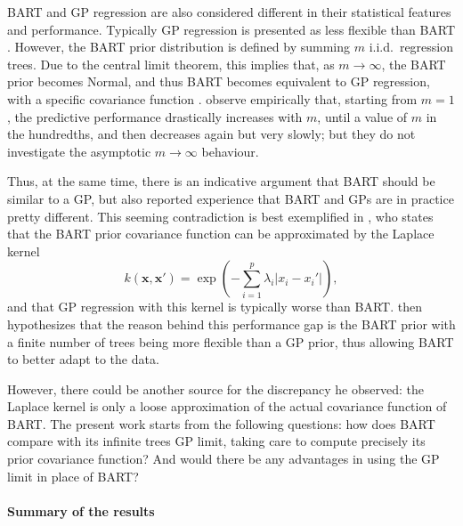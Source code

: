 \documentclass[a4paper]{article}
\theoremstyle{definition}
\begin{document}
    BART and GP regression are also considered different in their statistical features and performance. Typically GP regression is presented as less flexible than BART \autocite[see, e.g.,][]{jeong2023}. However, the BART prior distribution is defined by summing $m$ i.i.d.\ regression trees. Due to the central limit theorem, this implies that, as $m\to\infty$, the BART prior becomes Normal, and thus BART becomes equivalent to GP regression, with a specific covariance function \autocite[th.~1]{linero2017}. \textcite[\S2.2.5, p.~273]{chipman2010} observe empirically that, starting from $m=1$, the predictive performance drastically increases with $m$, until a value of $m$ in the hundredths, and then decreases again but very slowly; but they do not investigate the asymptotic $m\to\infty$ behaviour.

    Thus, at the same time, there is an indicative argument that BART should be similar to a GP, but also reported experience that BART and GPs are in practice pretty different. This seeming contradiction is best exemplified in \textcite[\S5.2, p.~554]{linero2017}, who states that the BART prior covariance function can be approximated by the Laplace kernel
    \begin{equation}
        k(\mathbf x, \mathbf x') = \exp\left(
            -\sum_{i=1}^p \lambda_i |x_i - x_i'|
        \right),
    \end{equation}
    and that GP regression with this kernel is typically worse than BART. \textcite{linero2017} then hypothesizes that the reason behind this performance gap is the BART prior with a finite number of trees being more flexible than a GP prior, thus allowing BART to better adapt to the data.

    However, there could be another source for the discrepancy he observed: the Laplace kernel is only a loose approximation of the actual covariance function of BART. The present work starts from the following questions: how does BART compare with its infinite trees GP limit, taking care to compute precisely its prior covariance function? And would there be any advantages in using the GP limit in place of BART?

    \paragraph{Summary of the results}
\end{document}

